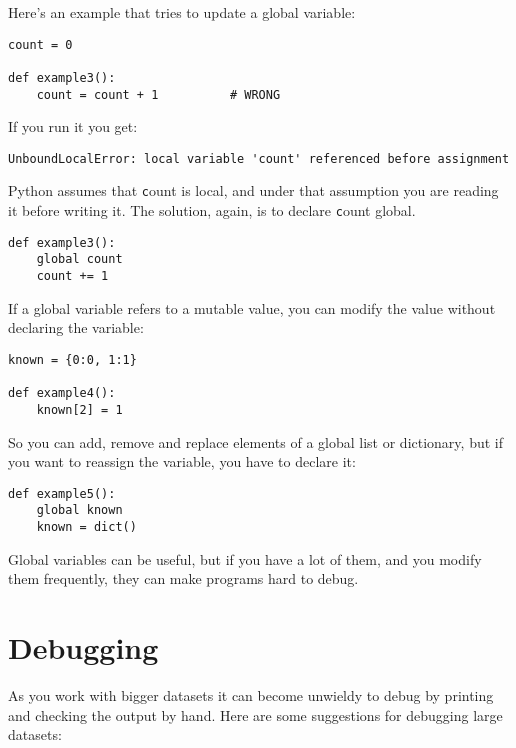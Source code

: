 \documentclass[
DIV=11,
fontsize=13,
twoside,
headinclude=false,
titlepage=firstiscover,
abstract=true,
headsepline=true,
footsepline=true,
chapterprefix=true, %
headings=big,
bibliography=totoc,%
captions=tableheading
]{scrbook}
\theoremstyle{definition}
\begin{document}
Here's an example that tries to update a global variable:

\begin{lstlisting}
count = 0

def example3():
    count = count + 1          # WRONG
\end{lstlisting}
%
If you run it you get:

\begin{lstlisting}
UnboundLocalError: local variable 'count' referenced before assignment
\end{lstlisting}
%
Python assumes that {\texttt count} is local, and under that assumption
you are reading it before writing it.  The solution, again,
is to declare {\texttt count} global.

\begin{lstlisting}
def example3():
    global count
    count += 1
\end{lstlisting}
%
If a global variable refers to a mutable value, you can modify
the value without declaring the variable:

\begin{lstlisting}
known = {0:0, 1:1}

def example4():
    known[2] = 1
\end{lstlisting}
%
So you can add, remove and replace elements of a global list or
dictionary, but if you want to reassign the variable, you
have to declare it:

\begin{lstlisting}
def example5():
    global known
    known = dict()
\end{lstlisting}
%
Global variables can be useful, but if you have a lot of them,
and you modify them frequently, they can make programs
hard to debug.


\section{Debugging}

As you work with bigger datasets it can become unwieldy to
debug by printing and checking the output by hand.  Here are some
suggestions for debugging large datasets:
\end{document}
